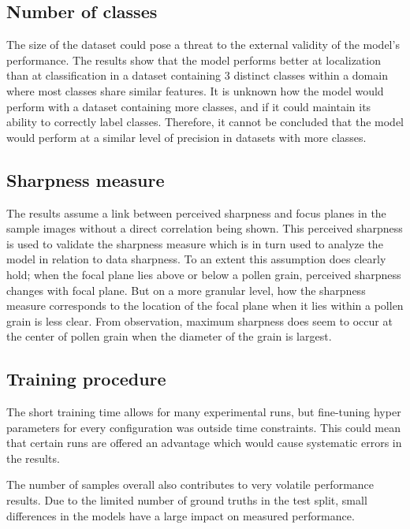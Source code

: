\subsection{Number of classes}
The size of the dataset could pose a threat to the external validity of the model's performance.
The results show that the model performs better at localization than at classification in a dataset containing 3 distinct classes within a domain where most classes share similar features.
It is unknown how the model would perform with a dataset containing more classes, and if it could maintain its ability to correctly label classes.
Therefore, it cannot be concluded that the model would perform at a similar level of precision in datasets with more classes.

\subsection{Sharpness measure}
The results assume a link between perceived sharpness and focus planes in the sample images without a direct correlation being shown.
This perceived sharpness is used to validate the sharpness measure which is in turn used to analyze the model in relation to data sharpness.
To an extent this assumption does clearly hold; when the focal plane lies above or below a pollen grain, perceived sharpness changes with focal plane.
But on a more granular level, how the sharpness measure corresponds to the location of the focal plane when it lies within a pollen grain is less clear.
From observation, maximum sharpness does seem to occur at the center of pollen grain when the diameter of the grain is largest.

\subsection{Training procedure}
The short training time allows for many experimental runs, but fine-tuning hyper parameters for every configuration was outside time constraints.
This could mean that certain runs are offered an advantage which would cause systematic errors in the results.

The number of samples overall also contributes to very volatile performance results.
Due to the limited number of ground truths in the test split, small differences in the models have a large impact on measured performance.
